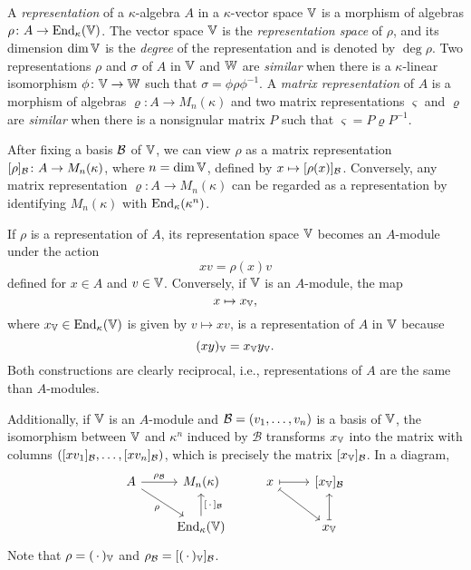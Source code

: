 \begin{defns}
    A \textsl{representation} of a $\kappa$-algebra $A$ in a $\kappa$-vector space $\mathbb V$ is a morphism of algebras $\rho\colon A\to{\operatorname{End}}_\kappa(\mathbb V)$. The vector space $\mathbb V$ is the \textsl{representation space} of $\rho$, and its dimension $\dim\mathbb V$ is the \textsl{degree} of the representation and is denoted by $\deg\rho$. Two representations $\rho$ and $\sigma$ of $A$ in $\mathbb V$ and $\mathbb W$ are \textsl{similar} when there is a $\kappa$-linear isomorphism $\phi\colon\mathbb V\to\mathbb W$ such that $\sigma=\phi\rho\phi^{-1}$. A \textsl{matrix representation} of $A$ is a morphism of algebras $\varrho\colon A\to M_n(\kappa)$ and two matrix representations $\varsigma$ and $\varrho$ are \textsl{similar} when there is a nonsignular matrix $P$ such that $\varsigma=P\varrho P^{-1}$.
\end{defns}

\begin{rem}
    After fixing a basis $\mathcal B$ of $\mathbb V$, we can view $\rho$ as a matrix representation $[\rho]_{\mathcal B}\colon A \to M_n(\kappa)$, where $n = \dim \mathbb V$, defined by $x \mapsto [\rho(x)]_{\mathcal B}$. Conversely, any matrix representation $\varrho\colon A \to M_n(\kappa)$ can be regarded as a representation by identifying $M_n(\kappa)$ with ${\operatorname{End}}_\kappa(\kappa^n)$.
\end{rem}



\begin{rem}\label{rem:representations-and-modules}
    If $\rho$ is a representation of $A$, its representation space $\mathbb V$ becomes an $A$-module under the action
    $$
        xv = \rho(x)v
    $$
    defined for $x\in A$ and $v\in\mathbb V$. Conversely, if $\mathbb V$ is an $A$-module, the map
    \begin{equation}\label{eq:regular-representation}
        x\mapsto x_\mathbb V,
    \end{equation}
    where $x_\mathbb V\in{\operatorname{End}}_\kappa(\mathbb V)$ is given by $v\mapsto xv$, is a representation of $A$ in $\mathbb V$ because
    $$
        (xy)_\mathbb V = x_\mathbb V y_\mathbb V.
    $$
    Both constructions are clearly reciprocal, i.e., representations of $A$ are the same than $A$-modules.

    Additionally, if $\mathbb V$ is an $A$-module and $\mathcal B=(v_1,\dots,v_n)$ is a basis of $\mathbb V$, the isomorphism between $\mathbb V$ and $\kappa^n$ induced by $\mathcal B$ transforms $x_\mathbb V$ into the matrix with columns $([xv_1]_{\mathcal B},\dots,[xv_n]_{\mathcal B})$, which is precisely the matrix $[x_\mathbb V]_{\mathcal B}$. In a diagram,
    $$
        \begin{tikzcd}
            A
                    \arrow[r,"\rho_{\basis B}"]
                    \arrow[rd,"\rho"']
                &M_n(\kappa)
                &x
                    \arrow[r,mapsto]
                    \arrow[rd,mapsto]
                &{[x_\V]_{\basis B}}\\
                &\End_\kappa(\V)
                    \arrow[u,"{[\,\cdot\,]_{\basis B}}"']
                &&x_\V
                    \arrow[u,mapsto]
        \end{tikzcd}
    $$
    Note that $\rho=(\,\cdot\,)_\mathbb V$ and $\rho_{\mathcal B} = [(\,\cdot\,)_\mathbb V]_{\mathcal B}$.
\end{rem}


